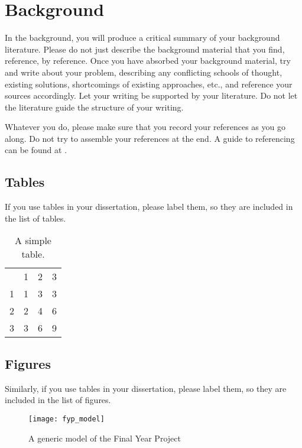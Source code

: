 %
%

\chapter{Background}

In the background, you will produce a critical summary of your background
literature.  Please do not just describe the background material that you find,
reference, by reference.  Once you have absorbed your background material, try
and write about your problem, describing any conflicting schools of thought,
existing solutions, shortcomings of existing approaches, etc., and reference
your sources accordingly.  Let your writing be supported by your literature.
Do not let the literature guide the structure of your writing.

Whatever you do, please make sure that you record your references as you go
along. Do not try to assemble your references at the end. A guide to
referencing can be found at \parencite{brunel2013ref}.

\section{Tables}

If you use tables in your dissertation, please label them, so they are included
in the list of tables.


\begin{table}[h]
  \centering
  \begin{tabular}{l | l | l | l }
    & 1 & 2 & 3 \\
    1 & 1 & 3 & 3 \\
    2 & 2 & 4 & 6 \\
    3 & 3 & 6 & 9 \\
  \end{tabular}
  \caption{A simple table.\label{tab:simple_table}}
\end{table}

\section{Figures}

Similarly, if you use tables in your dissertation, please label them, so they
are included in the list of figures.

\begin{figure}[h]
  \centering
  \texttt{[image: fyp\_model]}
  \caption{A generic model of the Final Year Project\label{fig:fyp_model}}
\end{figure}
